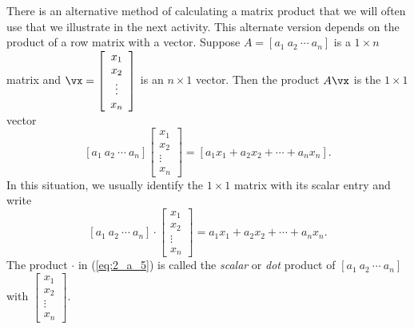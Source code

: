 There is an alternative method of calculating a matrix product that we will often use that we illustrate in the next activity. This alternate version depends on the product of a row matrix with a vector. Suppose $A = [a_1 \ a_2 \ \cdots \ a_n]$ is a $1 \times n$ matrix and $\vx = \left[ \begin{array}{c} x_1 \\ x_2 \\ \vdots \\ x_n \end{array} \right]$ is an $n \times 1$ vector. Then the product $A \vx$ is the $1 \times 1$ vector 
\[[a_1 \ a_2 \ \cdots \ a_n]\left[ \begin{array}{c} x_1 \\ x_2 \\ \vdots \\ x_n \end{array} \right] = [a_1x_1+a_2x_2 + \cdots + a_nx_n].\]
In this situation, we usually identify the $1 \times 1$ matrix with its scalar entry and write 
\begin{equation} \label{eq:2_a_5}
[a_1 \ a_2 \ \cdots \ a_n] \cdot \left[ \begin{array}{c} x_1 \\ x_2 \\ \vdots \\ x_n \end{array} \right] = a_1x_1+a_2x_2 + \cdots + a_nx_n.
\end{equation}
The product $\cdot$ in (\ref{eq:2_a_5}) is called the \emph{scalar} or \emph{dot} product of $[a_1 \ a_2 \ \cdots \ a_n]$ with $\left[ \begin{array}{c} x_1 \\ x_2 \\ \vdots \\ x_n \end{array} \right]$. 



